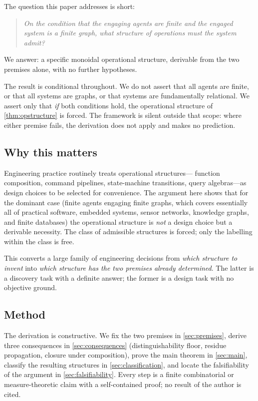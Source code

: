 \documentclass[11pt,a4paper]{article}
\theoremstyle{thmstyle}
\theoremstyle{definition}
\theoremstyle{remark}
\begin{document}
The question this paper addresses is short:
\begin{quote}\itshape
On the condition that the engaging agents are finite and the engaged
system is a finite graph, what structure of operations must the
system admit?
\end{quote}
We answer: a specific monoidal operational structure, derivable from
the two premises alone, with no further hypotheses.

The result is conditional throughout. We do not assert that all
agents are finite, or that all systems are graphs, or that systems
are fundamentally relational. We assert only that \emph{if} both
conditions hold, the operational structure of
\cref{thm:opstructure} is forced. The framework is silent outside
that scope: where either premise fails, the derivation does not
apply and makes no prediction.

\subsection{Why this matters}

Engineering practice routinely treats operational structures---
function composition, command pipelines, state-machine transitions,
query algebras---as design choices to be selected for convenience.
The argument here shows that for the dominant case (finite agents
engaging finite graphs, which covers essentially all of practical
software, embedded systems, sensor networks, knowledge graphs, and
finite databases) the operational structure is \emph{not} a design
choice but a derivable necessity. The class of admissible structures
is forced; only the labelling within the class is free.

This converts a large family of engineering decisions from
\emph{which structure to invent} into \emph{which structure has the
two premises already determined}. The latter is a discovery task
with a definite answer; the former is a design task with no
objective ground.

\subsection{Method}

The derivation is constructive. We fix the two premises in
\cref{sec:premises}, derive three consequences in
\cref{sec:consequences} (distinguishability floor, residue
propagation, closure under composition), prove the main theorem in
\cref{sec:main}, classify the resulting structures in
\cref{sec:classification}, and locate the falsifiability of the
argument in \cref{sec:falsifiability}. Every step is a finite
combinatorial or measure-theoretic claim with a self-contained
proof; no result of the author is cited.
\end{document}
